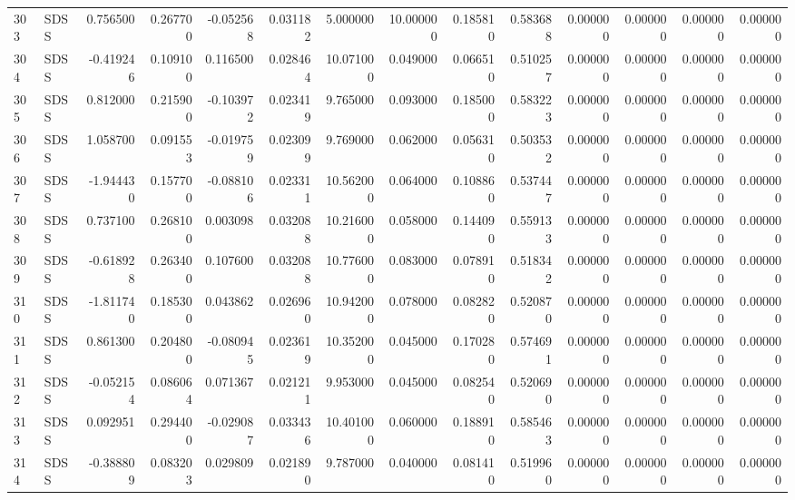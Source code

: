 \begin{tabular}{llrrrrrrrrrrrr}
303 &   SDSS &  0.756500 &      0.267700 & -0.052568 &    0.031182 &   5.000000 &     10.000000 &   0.185810 &  0.583688 &  0.000000 &   0.000000 &     0.000000 &     0.000000 \\
304 &   SDSS & -0.419246 &      0.109100 &  0.116500 &    0.028464 &  10.071000 &      0.049000 &   0.066510 &  0.510257 &  0.000000 &   0.000000 &     0.000000 &     0.000000 \\
305 &   SDSS &  0.812000 &      0.215900 & -0.103972 &    0.023419 &   9.765000 &      0.093000 &   0.185000 &  0.583223 &  0.000000 &   0.000000 &     0.000000 &     0.000000 \\
306 &   SDSS &  1.058700 &      0.091553 & -0.019759 &    0.023099 &   9.769000 &      0.062000 &   0.056310 &  0.503532 &  0.000000 &   0.000000 &     0.000000 &     0.000000 \\
307 &   SDSS & -1.944430 &      0.157700 & -0.088106 &    0.023311 &  10.562000 &      0.064000 &   0.108860 &  0.537447 &  0.000000 &   0.000000 &     0.000000 &     0.000000 \\
308 &   SDSS &  0.737100 &      0.268100 &  0.003098 &    0.032088 &  10.216000 &      0.058000 &   0.144090 &  0.559133 &  0.000000 &   0.000000 &     0.000000 &     0.000000 \\
309 &   SDSS & -0.618928 &      0.263400 &  0.107600 &    0.032088 &  10.776000 &      0.083000 &   0.078910 &  0.518342 &  0.000000 &   0.000000 &     0.000000 &     0.000000 \\
310 &   SDSS & -1.811740 &      0.185300 &  0.043862 &    0.026960 &  10.942000 &      0.078000 &   0.082820 &  0.520870 &  0.000000 &   0.000000 &     0.000000 &     0.000000 \\
311 &   SDSS &  0.861300 &      0.204800 & -0.080945 &    0.023619 &  10.352000 &      0.045000 &   0.170280 &  0.574691 &  0.000000 &   0.000000 &     0.000000 &     0.000000 \\
312 &   SDSS & -0.052154 &      0.086064 &  0.071367 &    0.021211 &   9.953000 &      0.045000 &   0.082540 &  0.520690 &  0.000000 &   0.000000 &     0.000000 &     0.000000 \\
313 &   SDSS &  0.092951 &      0.294400 & -0.029087 &    0.033436 &  10.401000 &      0.060000 &   0.188910 &  0.585463 &  0.000000 &   0.000000 &     0.000000 &     0.000000 \\
314 &   SDSS & -0.388809 &      0.083203 &  0.029809 &    0.021890 &   9.787000 &      0.040000 &   0.081410 &  0.519960 &  0.000000 &   0.000000 &     0.000000 &     0.000000 \\

\end{tabular}
